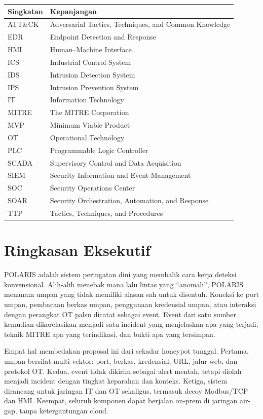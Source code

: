 \documentclass[12pt,a4paper]{article}
\begin{document}
\begin{tabular}{@{}p{}p{}@{}}
\toprule
\textbf{Singkatan} & \textbf{Kepanjangan} \\
\midrule
ATT\&CK & Adversarial Tactics, Techniques, and Common Knowledge \\
EDR & Endpoint Detection and Response \\
HMI & Human--Machine Interface \\
ICS & Industrial Control System \\
IDS & Intrusion Detection System \\
IPS & Intrusion Prevention System \\
IT & Information Technology \\
MITRE & The MITRE Corporation \\
MVP & Minimum Viable Product \\
OT & Operational Technology \\
PLC & Programmable Logic Controller \\
SCADA & Supervisory Control and Data Acquisition \\
SIEM & Security Information and Event Management \\
SOC & Security Operations Center \\
SOAR & Security Orchestration, Automation, and Response \\
TTP & Tactics, Techniques, and Procedures \\
\bottomrule
\end{tabular}

\section*{Ringkasan Eksekutif}

POLARIS adalah sistem peringatan dini yang membalik cara kerja deteksi konvensional. Alih-alih menebak mana lalu lintas yang ``anomali'', POLARIS menanam umpan yang tidak memiliki alasan sah untuk disentuh. Koneksi ke port umpan, pembacaan berkas umpan, penggunaan kredensial umpan, atau interaksi dengan perangkat OT palsu dicatat sebagai event. Event dari satu sumber kemudian dikorelasikan menjadi satu incident yang menjelaskan apa yang terjadi, teknik MITRE apa yang terindikasi, dan bukti apa yang tersimpan.

Empat hal membedakan proposal ini dari sekadar honeypot tunggal. Pertama, umpan bersifat multi-vektor: port, berkas, kredensial, URL, jalur web, dan protokol OT. Kedua, event tidak dikirim sebagai alert mentah, tetapi diolah menjadi incident dengan tingkat keparahan dan konteks. Ketiga, sistem dirancang untuk jaringan IT dan OT sekaligus, termasuk decoy Modbus/TCP dan HMI. Keempat, seluruh komponen dapat berjalan on-prem di jaringan air-gap, tanpa ketergantungan cloud.
\end{document}
